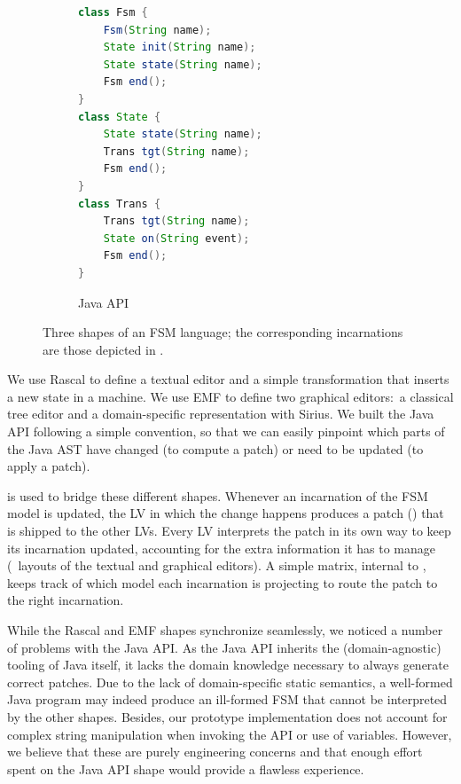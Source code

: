 \begin{figure}[bt]
	\enskip
	\vrule
	\enskip
	\begin{subfigure}[b]{.35\columnwidth}
		\begin{lstlisting}[label=lst:fsm-api, language=Java, numbers=none, xleftmargin=0pt, tabsize=1]
class Fsm {
	Fsm(String name);
	State init(String name);
	State state(String name);
	Fsm end();
}
class State {
	State state(String name);
	Trans tgt(String name);
	Fsm end();
}
class Trans {
	Trans tgt(String name);
	State on(String event);
	Fsm end();
}
		\end{lstlisting}
		\caption{Java API}
	\end{subfigure}
	\caption{Three shapes of an FSM language; the corresponding incarnations are those depicted in .}
	\label{fig:3fsms}
\end{figure}

We use Rascal to define a textual editor and a simple transformation that inserts a new state in a machine.
We use EMF to define two graphical editors:~a classical tree editor and a domain-specific representation with Sirius.
We built the Java API following a simple convention, so that we can easily pinpoint which parts of the Java AST have changed (to compute a patch) or need to be updated (to apply a patch).

\prism is used to bridge these different shapes.
Whenever an incarnation of the FSM model is updated, the LV in which the change happens produces a patch (\cf{}) that is shipped to the other LVs.
Every LV interprets the patch in its own way to keep its incarnation updated, accounting for the extra information it has to manage (\eg~layouts of the textual and graphical editors).
A simple matrix, internal to \prism, keeps track of which model each incarnation is projecting to route the patch to the right incarnation.


While the Rascal and EMF shapes synchronize seamlessly, we noticed a number of problems with the Java API.
As the Java API inherits the (domain-agnostic) tooling of Java itself, it lacks the domain knowledge necessary to always generate correct patches.
Due to the lack of domain-specific static semantics, a well-formed Java program may indeed produce an ill-formed FSM that cannot be interpreted by the other shapes.
Besides, our prototype implementation does not account for complex string manipulation when invoking the API or use of variables.
However, we believe that these are purely engineering concerns and that enough effort spent on the Java API shape would provide a flawless experience.

